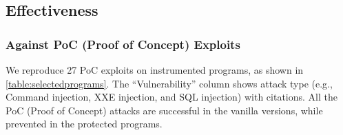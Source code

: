 %

\vspace{-1em}
\subsection{Effectiveness}
\label{subsec:eval_attack}

\subsubsection{Against PoC (Proof of Concept) Exploits}
\label{subsec:poc_eval}
We reproduce 27 PoC exploits on \sysname instrumented programs, as shown in \autoref{table:selectedprograms}.
The ``Vulnerability'' column shows attack type (e.g., Command injection, XXE injection, and SQL injection) with citations.
All the PoC (Proof of Concept) attacks are successful in the vanilla versions, while prevented in the \sysname protected programs.

